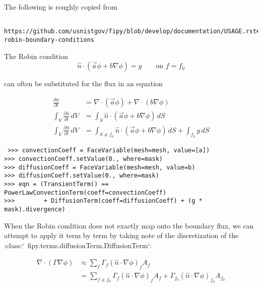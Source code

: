 \documentclass{article}
\begin{document}
The following is roughly copied from
\begin{verbatim}
 https://github.com/usnistgov/fipy/blob/develop/documentation/USAGE.rst#applying-robin-boundary-conditions
\end{verbatim} 

The Robin condition
\begin{equation*}
\hat{n}\cdot\left(\vec{a}\phi + b\nabla\phi\right) = g\qquad\text{on $f=f_0$}
\end{equation*} 

can often be substituted for the flux in an equation

\begin{equation*}
\begin{aligned}
     \frac{\partial\phi}{\partial t}
     &= \nabla\cdot\left(\vec{a}\phi\right) + \nabla\cdot\left(b\nabla\phi\right)
     \\
     \int_V\frac{\partial\phi}{\partial t}\,dV
     &= \int_S \hat{n} \cdot \left(\vec{a}\phi + b\nabla\phi\right) \, dS
     \\
     \int_V\frac{\partial\phi}{\partial t}\,dV
     &= \int_{S\neq f_0} \hat{n} \cdot \left(\vec{a}\phi + b\nabla\phi\right) \, dS
     + \int_{f_0} g \, dS
\end{aligned}
\end{equation*} 

\begin{verbatim}
 >>> convectionCoeff = FaceVariable(mesh=mesh, value=[a])
>>> convectionCoeff.setValue(0., where=mask)
>>> diffusionCoeff = FaceVariable(mesh=mesh, value=b)
>>> diffusionCoeff.setValue(0., where=mask)
>>> eqn = (TransientTerm() == PowerLawConvectionTerm(coeff=convectionCoeff)
>>>        + DiffusionTerm(coeff=diffusionCoeff) + (g * mask).divergence)
\end{verbatim} 

When the Robin condition does not exactly map onto the boundary flux, we can attempt to apply it term by term by taking note of the discretization of the :class:`~fipy.terms.diffusionTerm.DiffusionTerm`:

\begin{equation*}
\begin{aligned}
    \nabla\cdot\left(\Gamma\nabla\phi\right) &\approx
    \sum_f \Gamma_f \left(\hat{n}\cdot\nabla\phi\right)_f A_f \\
    &= \sum_{f\neq f_0} \Gamma_f \left(\hat{n}\cdot\nabla\phi\right)_f A_f
    + \Gamma_{f_0} \left(\hat{n}\cdot\nabla\phi\right)_{f_0} A_{f_0}
\end{aligned}
\end{equation*} 
\end{document}
